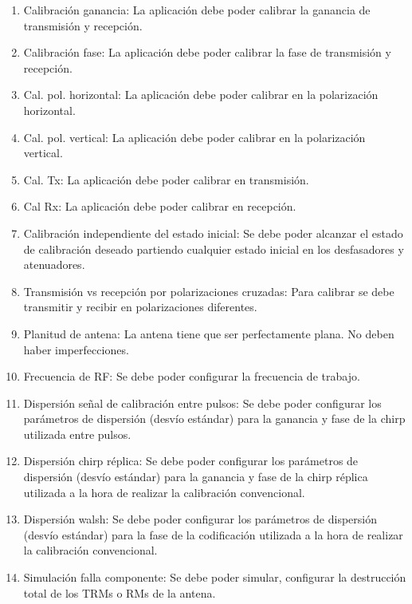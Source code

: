 \begin{enumerate}
    \item Calibración ganancia: La aplicación debe poder calibrar la ganancia de transmisión y recepción.

    \item Calibración fase: La aplicación debe poder calibrar la fase de transmisión y recepción.

    \item Cal. pol. horizontal: La aplicación debe poder calibrar en la polarización horizontal.
    \item Cal. pol. vertical: La aplicación debe poder calibrar en la polarización vertical.
    \item Cal. Tx: La aplicación debe poder calibrar en transmisión.
    \item Cal Rx: La aplicación debe poder calibrar en recepción.

    \item Calibración independiente del estado inicial: Se debe poder alcanzar el estado de calibración deseado partiendo
		cualquier estado inicial en los desfasadores y atenuadores.

    \item Transmisión vs recepción por polarizaciones cruzadas: Para calibrar se debe transmitir y recibir en polarizaciones
		diferentes.

    \item Planitud de antena: La antena tiene que ser perfectamente plana. No deben haber imperfecciones.

    \item Frecuencia de RF: Se debe poder configurar la frecuencia de trabajo.

    \item Dispersión señal de calibración entre pulsos: Se debe poder configurar los parámetros de dispersión (desvío estándar) para
		la ganancia y fase de la chirp utilizada entre pulsos.

    \item Dispersión chirp réplica: Se debe poder configurar los parámetros de dispersión (desvío estándar) para la
		ganancia y fase de la chirp réplica utilizada a la hora de realizar la calibración convencional.

    \item Dispersión walsh: Se debe poder configurar los parámetros de dispersión (desvío estándar) para la fase de la
		codificación utilizada a la hora de realizar la calibración convencional.

    \item Simulación falla componente: Se debe poder simular, configurar la destrucción total de los TRMs o RMs de la antena.
\end{enumerate}


